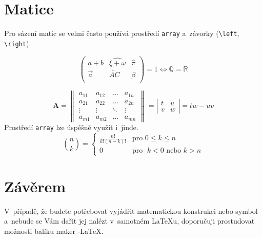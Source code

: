 \documentclass[a4paper, 11 pt, twocolumn]{article}
\theoremstyle{definition}
\begin{document}
\section{Matice}
Pro sázení matic se velmi často používá prostředí \verb|array| a~závorky (\verb|\left|, \verb|\right|).

$$ 
\left
(\begin{array}{ccc}
a+b & \widehat{\xi + \omega} & \hat{\pi} \\
\vec{a} & \overleftrightarrow{AC} & \beta \\
\end{array}
\right)
= 1 \Longleftrightarrow \mathbb{Q} = \mathbb{R}
$$

$$
\mathbf{A} =
\left\|
\begin{array}{cccc}
a_{11} & a_{12} & \ldots & a_{1n} \\
a_{21} & a_{22} & \ldots & a_{2n} \\
\vdots & \vdots & \ddots & \vdots \\
a_{m1} & a_{m2} & \ldots & a_{mn}

\end{array}
\right\| = \left|
		\begin{array}{cc}
			t & u\\
			v & w
		\end{array}
		\right| = tw - uv
$$
Prostředí \verb|array| lze úspěšně využít i~jinde.
$$
\binom{n}{k} =
\left\{
\begin{array}{ll}
	\frac{n!}{k! (n - k)!} & \text{pro } 0 \leq k\leq n \\
	0 & \text{pro } \;k < 0 \text{ nebo } k > n
\end{array}
\right.
$$ 
\section{Závěrem}
V~případě, že budete potřebovat vyjádřit matematickou
konstrukci nebo symbol a~nebude se Vám dařit jej nalézt
v~samotném {\LaTeX}u, doporučuji prostudovat možnosti balíku
maker \AmS-\LaTeX.
\end{document}
